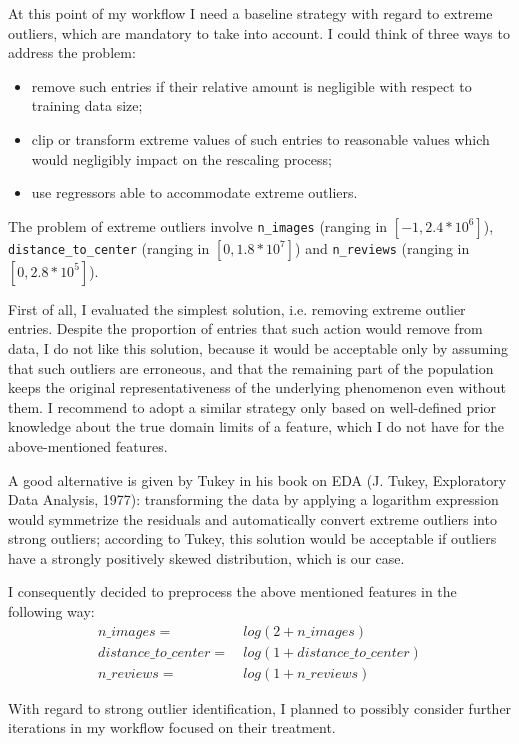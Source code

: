 \documentclass[preprint,12pt,3p]{elsarticle}
\begin{document}
At this point of my workflow I need a baseline strategy with regard to extreme outliers, which are mandatory to take into account. I could think of three ways to address the problem:
\begin{itemize}
	\item remove such entries if their relative amount is negligible with respect to training data size;
	\item clip or transform extreme values of such entries to reasonable values which would negligibly impact on the rescaling process;
	\item use regressors able to accommodate extreme outliers.
\end{itemize}

The problem of extreme outliers involve \verb|n_images| (ranging in $[-1,2.4*10^6]$), \verb|distance_to_center| (ranging in $[0,1.8*10^7]$) and \verb|n_reviews| (ranging in $[0,2.8*10^5]$).

First of all, I evaluated the simplest solution, i.e. removing extreme outlier entries. Despite the proportion of entries that such action would remove from data, I do not like this solution, because it would be acceptable only by assuming that such outliers are erroneous, and that the remaining part of the population keeps the original representativeness of the underlying phenomenon even without them. I recommend to adopt a similar strategy only based on well-defined prior knowledge about the true domain limits of a feature, which I do not have for the above-mentioned features.

A good alternative is given by Tukey in his book on EDA (J. Tukey, Exploratory Data Analysis, 1977): transforming the data by applying a logarithm expression would symmetrize the residuals and automatically convert extreme outliers into strong outliers; according to Tukey, this solution would be acceptable if outliers have a strongly positively skewed distribution, which is our case.

I consequently decided to preprocess the above mentioned features in the following way:
\begin{align}
	n\_images = & \ log(2+n\_images)\\
	distance\_to\_center = & \ log(1+distance\_to\_center)\\
	n\_reviews = & \ log(1+n\_reviews)
\end{align}

With regard to strong outlier identification, I planned to possibly consider further iterations in my workflow focused on their treatment.
\end{document}
